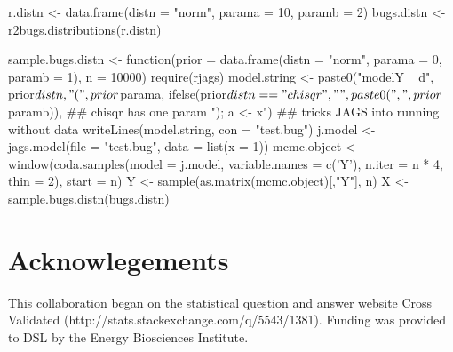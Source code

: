 \begin{smallexample}

r.distn <- data.frame(distn = "norm", parama = 10, paramb = 2)
bugs.distn <- r2bugs.distributions(r.distn)

sample.bugs.distn <- function(prior = data.frame(distn = "norm", parama = 0, paramb = 1), n = 10000) {
  require(rjags)
  model.string <- paste0("model{Y ~ d", prior$distn, "(", prior$parama, 
                         ifelse(prior$distn == "chisqr", "", paste0(", ", prior$paramb)), ## chisqr has one param
                         "); a <- x}")  ## tricks JAGS into running without data  
  writeLines(model.string, con = "test.bug")
  j.model  <- jags.model(file = "test.bug", data = list(x = 1))
  mcmc.object <- window(coda.samples(model = j.model, variable.names = c('Y'), n.iter = n * 4, thin = 2),
                        start = n)
  Y <- sample(as.matrix(mcmc.object)[,"Y"], n)
}
X <- sample.bugs.distn(bugs.distn)
\end{smallexample}

\section{Acknowlegements}

This collaboration began on the statistical question and answer website Cross Validated (http://stats.stackexchange.com/q/5543/1381). Funding was provided to DSL by the Energy Biosciences Institute.



\newpage
\address{David S. LeBauer\\
Department of Plant Biology\\
Energy Biosciences Institute\\
University of Illinois, USA}\\

\address{Michael C. Dietze\\
Department of Earth And Environment\\
Boston University, USA}

\address{Ben M. Bolker\\
Department of Mathematics and Statistics\\
McMaster University, Canada}
